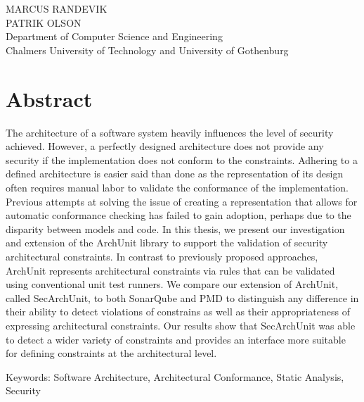 \oneLineTitle\\
\oneLineSubtitle\\
MARCUS RANDEVIK\\
PATRIK OLSON\\
Department of Computer Science and Engineering\\
Chalmers University of Technology and University of Gothenburg\setlength{\parskip}{0.5cm}

\thispagestyle{plain}			%
\setlength{\parskip}{0pt plus 1.0pt}
\section*{Abstract}
The architecture of a software system heavily influences the level of security achieved.  However, a perfectly designed architecture does not provide any security if the implementation does not conform to the constraints. Adhering to a defined architecture is easier said than done as the representation of its design often requires manual labor to validate the conformance of the implementation. Previous attempts at solving the issue of creating a representation that allows for automatic conformance checking has failed to gain adoption, perhaps due to the disparity between models and code. In this thesis, we present our investigation and extension of the ArchUnit library to support the validation of security architectural constraints. In contrast to previously proposed approaches, ArchUnit represents architectural constraints via rules that can be validated using conventional unit test runners.  We compare our extension of ArchUnit, called SecArchUnit, to both SonarQube and PMD to distinguish any difference in their ability to detect violations of constrains as well as their appropriateness of expressing architectural constraints. Our results show that SecArchUnit was able to detect a wider variety of constraints and provides an interface more suitable for defining constraints at the architectural level.

\vfill
Keywords: Software Architecture, Architectural Conformance, Static Analysis, Security

\newpage				%
\thispagestyle{empty}
\mbox{}